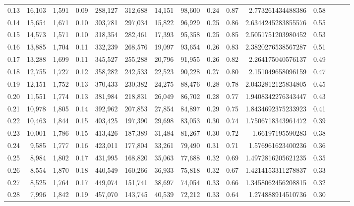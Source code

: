 \begin{tabular}{rrrrrrrrrrrrrrr}
0.13 &  16,103 &  1,591 &  0.09 &  288,127 &  312,688 &   14,151 &   98,600 &  0.24 &  0.87 &     2.773261434488386 &      0.58 \\
0.14 &  15,654 &  1,671 &  0.10 &  303,781 &  297,034 &   15,822 &   96,929 &  0.25 &  0.86 &    2.6344245283855576 &      0.55 \\
0.15 &  14,573 &  1,571 &  0.10 &  318,354 &  282,461 &   17,393 &   95,358 &  0.25 &  0.85 &    2.5051751203980452 &      0.53 \\
0.16 &  13,885 &  1,704 &  0.11 &  332,239 &  268,576 &   19,097 &   93,654 &  0.26 &  0.83 &    2.3820276538567287 &      0.51 \\
0.17 &  13,288 &  1,699 &  0.11 &  345,527 &  255,288 &   20,796 &   91,955 &  0.26 &  0.82 &     2.264175040576137 &      0.49 \\
0.18 &  12,755 &  1,727 &  0.12 &  358,282 &  242,533 &   22,523 &   90,228 &  0.27 &  0.80 &     2.151049658096159 &      0.47 \\
0.19 &  12,151 &  1,752 &  0.13 &  370,433 &  230,382 &   24,275 &   88,476 &  0.28 &  0.78 &    2.0432812125834805 &      0.45 \\
0.20 &  11,551 &  1,774 &  0.13 &  381,984 &  218,831 &   26,049 &   86,702 &  0.28 &  0.77 &    1.9408342276343447 &      0.43 \\
0.21 &  10,978 &  1,805 &  0.14 &  392,962 &  207,853 &   27,854 &   84,897 &  0.29 &  0.75 &    1.8434692375233923 &      0.41 \\
0.22 &  10,463 &  1,844 &  0.15 &  403,425 &  197,390 &   29,698 &   83,053 &  0.30 &  0.74 &    1.7506718343961472 &      0.39 \\
0.23 &  10,001 &  1,786 &  0.15 &  413,426 &  187,389 &   31,484 &   81,267 &  0.30 &  0.72 &      1.66197195590283 &      0.38 \\
0.24 &   9,585 &  1,777 &  0.16 &  423,011 &  177,804 &   33,261 &   79,490 &  0.31 &  0.71 &     1.576961623400236 &      0.36 \\
0.25 &   8,984 &  1,802 &  0.17 &  431,995 &  168,820 &   35,063 &   77,688 &  0.32 &  0.69 &    1.4972816205621235 &      0.35 \\
0.26 &   8,554 &  1,870 &  0.18 &  440,549 &  160,266 &   36,933 &   75,818 &  0.32 &  0.67 &    1.4214153311278837 &      0.33 \\
0.27 &   8,525 &  1,764 &  0.17 &  449,074 &  151,741 &   38,697 &   74,054 &  0.33 &  0.66 &    1.3458062456208815 &      0.32 \\
0.28 &   7,996 &  1,842 &  0.19 &  457,070 &  143,745 &   40,539 &   72,212 &  0.33 &  0.64 &     1.274888914510736 &      0.30 \\

\end{tabular}
